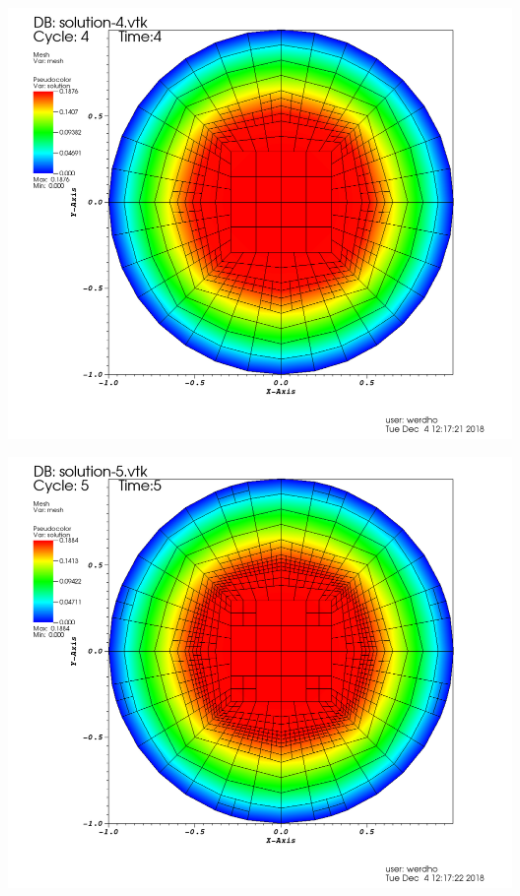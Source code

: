 \documentclass[9pt]{beamer}
\begin{document}
\begin{frame}
\begin{minipage}{.45\paperwidth}
	\centering
	\includegraphics[scale=.12]{solu-4-5.png}
\end{minipage}%
\begin{minipage}{.4\paperwidth}
	\centering
	\includegraphics[scale=.12]{solu-4-6.png}
\end{minipage}
\begin{minipage}{.45\paperwidth}
	\centering

\end{minipage}
\end{frame}
\end{document}
